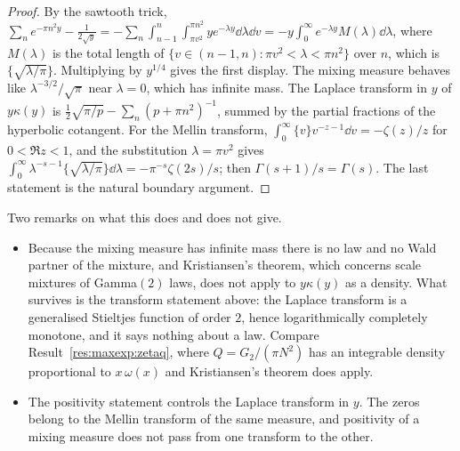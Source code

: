 \begin{proof}
\begin{sloppypar}
By the sawtooth trick, $\sum_ne^{-\pi n^2y}-\frac1{2\sqrt y}=-\sum_n\int_{n-1}^n\int_{\pi v^2}^{\pi n^2}ye^{-\lambda y}\dd\lambda\dd v=-y\int_0^\infty e^{-\lambda y}M(\lambda)\dd\lambda$, where $M(\lambda)$ is the total length of $\{v\in(n-1,n):\pi v^2<\lambda<\pi n^2\}$ over $n$, which is $\{\sqrt{\lambda/\pi}\}$. Multiplying by $y^{1/4}$ gives the first display. The mixing measure behaves like $\lambda^{-3/2}/\sqrt\pi$ near $\lambda=0$, which has infinite mass. The Laplace transform in $y$ of $y\kappa(y)$ is $\frac12\sqrt{\pi/p}-\sum_n(p+\pi n^2)^{-1}$, summed by the partial fractions of the hyperbolic cotangent. For the Mellin transform, $\int_0^\infty\{v\}v^{-z-1}\dd v=-\zeta(z)/z$ for $0<\Re z<1$, and the substitution $\lambda=\pi v^2$ gives $\int_0^\infty\lambda^{-s-1}\{\sqrt{\lambda/\pi}\}\dd\lambda=-\pi^{-s}\zeta(2s)/s$; then $\Gamma(s+1)/s=\Gamma(s)$. The last statement is the natural boundary argument.
\end{sloppypar}
\end{proof}


Two remarks on what this does and does not give.
\begin{itemize}
\item Because the mixing measure has infinite mass there is no law and no Wald partner of the mixture, and Kristiansen's theorem, which concerns scale mixtures of Gamma$(2)$ laws, does not apply to $y\kappa(y)$ as a density. What survives is the transform statement above: the Laplace transform is a generalised Stieltjes function of order $2$, hence logarithmically completely monotone, and it says nothing about a law. Compare Result~\ref{res:maxexp:zetaq}, where $Q=G_2/(\pi N^2)$ has an integrable density proportional to $x\,\omega(x)$ and Kristiansen's theorem does apply.
\item The positivity statement controls the Laplace transform in $y$. The zeros belong to the Mellin transform of the same measure, and positivity of a mixing measure does not pass from one transform to the other.
\end{itemize}

